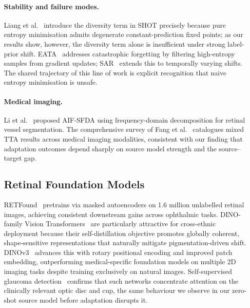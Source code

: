 \documentclass[11pt]{article}
\begin{document}
\paragraph{Stability and failure modes.}
Liang et al.\  introduce the diversity term in SHOT
precisely because pure entropy minimisation admits degenerate
constant-prediction fixed points; as our results show, however, the
diversity term alone is insufficient under strong label-prior shift. EATA~\cite{niu2022eata}
addresses catastrophic forgetting by filtering high-entropy samples from
gradient updates; SAR~\cite{niu2023sar} extends this to temporally varying
shifts. The shared trajectory of this line of work is explicit recognition
that naive entropy minimisation is unsafe.

\paragraph{Medical imaging.}
Li et al.\  proposed AIF-SFDA using frequency-domain
decomposition for retinal vessel segmentation. The comprehensive survey of
Fang et al.\  catalogues mixed TTA results across
medical imaging modalities, consistent with our finding that adaptation
outcomes depend sharply on source model strength and the source--target gap.

\subsection{Retinal Foundation Models}

RETFound~\cite{zhou2023} pretrains via masked autoencoders on 1.6 million
unlabelled retinal images, achieving consistent downstream gains across
ophthalmic tasks. DINO-family Vision Transformers~\cite{caron2021} are
particularly attractive for cross-ethnic deployment because their
self-distillation objective promotes globally coherent, shape-sensitive
representations that naturally mitigate pigmentation-driven shift.
DINOv3~\cite{simeoni2025} advances this with rotary positional encoding
and improved patch embedding, outperforming medical-specific foundation
models on multiple 2D imaging tasks despite training exclusively on natural
images. Self-supervised glaucoma detection~\cite{yi2024parcl} confirms
that such networks concentrate attention on the clinically relevant optic
disc and cup, the same behaviour we observe in our zero-shot source model
before adaptation disrupts it.

\end{document}
